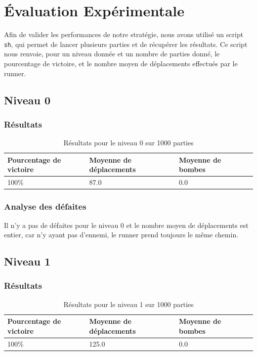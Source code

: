 \chapter{Évaluation Expérimentale}
\label{cp:evaluation}

Afin de valider les performances de notre stratégie, nous avons utilisé un script \texttt{sh}, qui permet de lancer plusieurs parties et de récupérer les résultats.
Ce script nous renvoie, pour un niveau donnée et un nombre de parties donné, le pourcentage de victoire, et le nombre moyen de déplacements effectués par le runner.

\section{Niveau 0}

\subsection{Résultats}

\begin{table}[!htpb]
    \begin{tabularx}{\textwidth}{lXXX}
        \toprule
        Pourcentage de victoire & Moyenne de déplacements & Moyenne de bombes \\
        \midrule
        100\% & 87.0 & 0.0 \\
        \bottomrule
    \end{tabularx}
    \caption{Résultats pour le niveau 0 sur 1000 parties}
    \label{tab:res-niveau-0}
\end{table}

\subsection{Analyse des défaites}

Il n'y a pas de défaites pour le niveau 0 et le nombre moyen de déplacements est entier, car n'y ayant pas d'ennemi, le runner prend toujours le même chemin.

\section{Niveau 1}

\subsection{Résultats}

\begin{table}[!htpb]
    \begin{tabularx}{\textwidth}{lXXX}
        \toprule
        Pourcentage de victoire & Moyenne de déplacements & Moyenne de bombes \\
        \midrule
        100\% & 125.0 & 0.0 \\
        \bottomrule
    \end{tabularx}
    \caption{Résultats pour le niveau 1 sur 1000 parties}
    \label{tab:res-niveau-1}
\end{table}

